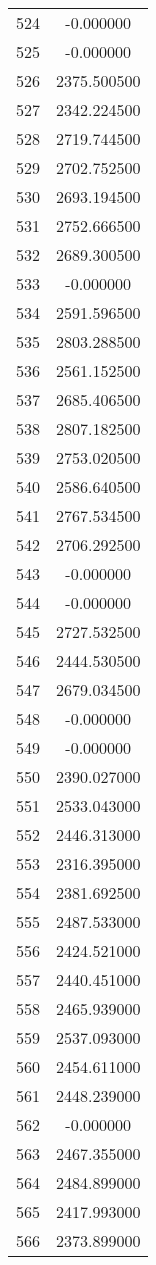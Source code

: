 \documentclass[12pt]{article}
\begin{document}
\begin{longtable}{@{}cc@{}}
524 & -0.000000 \\
525 & -0.000000 \\
526 & 2375.500500 \\
527 & 2342.224500 \\
528 & 2719.744500 \\
529 & 2702.752500 \\
530 & 2693.194500 \\
531 & 2752.666500 \\
532 & 2689.300500 \\
533 & -0.000000 \\
534 & 2591.596500 \\
535 & 2803.288500 \\
536 & 2561.152500 \\
537 & 2685.406500 \\
538 & 2807.182500 \\
539 & 2753.020500 \\
540 & 2586.640500 \\
541 & 2767.534500 \\
542 & 2706.292500 \\
543 & -0.000000 \\
544 & -0.000000 \\
545 & 2727.532500 \\
546 & 2444.530500 \\
547 & 2679.034500 \\
548 & -0.000000 \\
549 & -0.000000 \\
550 & 2390.027000 \\
551 & 2533.043000 \\
552 & 2446.313000 \\
553 & 2316.395000 \\
554 & 2381.692500 \\
555 & 2487.533000 \\
556 & 2424.521000 \\
557 & 2440.451000 \\
558 & 2465.939000 \\
559 & 2537.093000 \\
560 & 2454.611000 \\
561 & 2448.239000 \\
562 & -0.000000 \\
563 & 2467.355000 \\
564 & 2484.899000 \\
565 & 2417.993000 \\
566 & 2373.899000 \\

\end{longtable}
\end{document}

